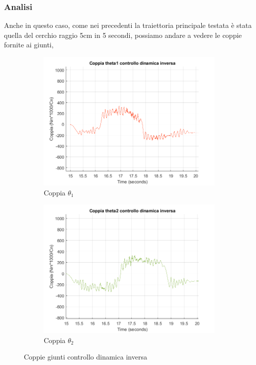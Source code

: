 \subsubsection*{Analisi}
Anche in questo caso, come nei precedenti la traiettoria principale testata è stata quella del cerchio raggio 5cm in 5 secondi, possiamo andare a vedere le coppie fornite ai giunti,
\begin{figure}
\begin{subfigure}{.53\textwidth}
  \includegraphics[width=.9\linewidth]{Immagini/Traiettorie/CoppiaT1ID}  
  \caption{Coppia $\theta_1$}
  \label{fig:sub-ikd1}
\end{subfigure}
\begin{subfigure}{.53\textwidth}
  \includegraphics[width=.9\linewidth]{Immagini/Traiettorie/CoppiaT2ID}  
  \caption{Coppia $\theta_2$}
  \label{fig:sub-ikd2}
\end{subfigure}
\caption{Coppie giunti controllo dinamica inversa}
\label{fig:CoppieID}
\end{figure}
